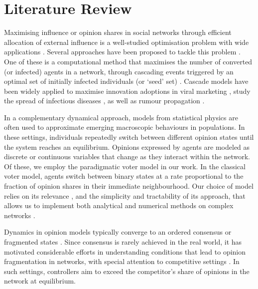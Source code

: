 \section{Literature Review}
 \label{background}
Maximising influence or opinion shares in social networks through efficient allocation of external influence is a well-studied optimisation problem with wide applications \cite{easley2010networks,rogers2010diffusion}. Several approaches have been proposed to tackle this problem \cite{noorazar2020recent,li2018influence}. One of these is a computational method that maximises the number of converted (or infected) agents in a network, through cascading events triggered by an optimal set of initially infected individuals (or `seed' set) \cite{kempe2003maximizing}. Cascade models have been widely applied to maximise innovation adoptions in viral marketing \cite{domingos2001mining}, study the spread of infectious diseases \cite{cheng2020outbreak}, as well as rumour propagation \cite{tripathy2010study}. 

In a complementary dynamical approach, models from statistical physics \cite{castellano2009statistical} are often used to approximate emerging macroscopic behaviours in populations. In these settings, individuals repeatedly switch between different opinion states \cite{barrat2008dynamical} until the system reaches an equilibrium. Opinions expressed by agents are modeled as discrete \cite{clifford1973model,galam1999application,holley1975ergodic,krapivsky2003dynamics} or continuous \cite{deffuant2000mixing,hegselmann2002opinion} variables that change as they interact within the network. Of these, we employ the paradigmatic voter model \cite{clifford1973model,holley1975ergodic,sood2005voter} in our work. In the classical voter model, agents switch between binary states at a rate proportional to the fraction of opinion shares in their immediate neighbourhood. Our choice of model relies on its relevance \cite{PMID:28542409}, and the simplicity and tractability of its approach, that allows us to implement both analytical and numerical methods on complex networks \cite{redner2019reality}.

Dynamics in opinion models typically converge to an ordered consensus or fragmented states \cite{castellano2009statistical}. Since consensus is rarely achieved in the real world, it has motivated considerable efforts in understanding conditions that lead to opinion fragmentation in networks, with special attention to competitive settings \cite{hucompeting,prakash2012winner}. In such settings, controllers aim to exceed the competitor's share of opinions in the network at equilibrium.

